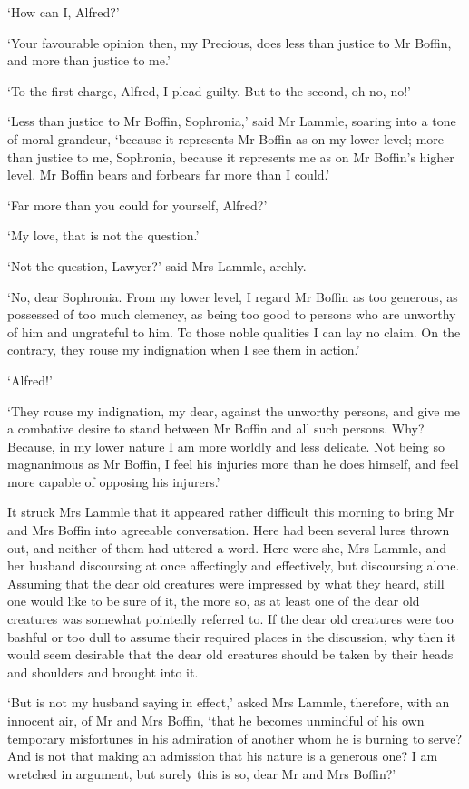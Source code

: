 ‘How can I, Alfred?’

‘Your favourable opinion then, my Precious, does less than justice to Mr
Boffin, and more than justice to me.’

‘To the first charge, Alfred, I plead guilty. But to the second, oh no,
no!’

‘Less than justice to Mr Boffin, Sophronia,’ said Mr Lammle, soaring
into a tone of moral grandeur, ‘because it represents Mr Boffin as on my
lower level; more than justice to me, Sophronia, because it represents
me as on Mr Boffin’s higher level. Mr Boffin bears and forbears far more
than I could.’

‘Far more than you could for yourself, Alfred?’

‘My love, that is not the question.’

‘Not the question, Lawyer?’ said Mrs Lammle, archly.

‘No, dear Sophronia. From my lower level, I regard Mr Boffin as too
generous, as possessed of too much clemency, as being too good to
persons who are unworthy of him and ungrateful to him. To those noble
qualities I can lay no claim. On the contrary, they rouse my indignation
when I see them in action.’

‘Alfred!’

‘They rouse my indignation, my dear, against the unworthy persons,
and give me a combative desire to stand between Mr Boffin and all such
persons. Why? Because, in my lower nature I am more worldly and less
delicate. Not being so magnanimous as Mr Boffin, I feel his injuries
more than he does himself, and feel more capable of opposing his
injurers.’

It struck Mrs Lammle that it appeared rather difficult this morning
to bring Mr and Mrs Boffin into agreeable conversation. Here had been
several lures thrown out, and neither of them had uttered a word. Here
were she, Mrs Lammle, and her husband discoursing at once affectingly
and effectively, but discoursing alone. Assuming that the dear old
creatures were impressed by what they heard, still one would like to be
sure of it, the more so, as at least one of the dear old creatures
was somewhat pointedly referred to. If the dear old creatures were too
bashful or too dull to assume their required places in the discussion,
why then it would seem desirable that the dear old creatures should be
taken by their heads and shoulders and brought into it.

‘But is not my husband saying in effect,’ asked Mrs Lammle, therefore,
with an innocent air, of Mr and Mrs Boffin, ‘that he becomes unmindful
of his own temporary misfortunes in his admiration of another whom he is
burning to serve? And is not that making an admission that his nature is
a generous one? I am wretched in argument, but surely this is so, dear
Mr and Mrs Boffin?’

